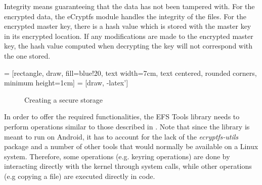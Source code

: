 Integrity means guaranteeing that the data has not been tampered with. For the encrypted data, the eCryptfs module handles the integrity of the files. For the encrypted master key, there is a hash value which is stored with the master key in its encrypted location. If any modifications are made to the encrypted master key, the hash value computed when decrypting the key will not correspond with the one stored.

 = [rectangle, draw, fill=blue!20, 
    text width=7cm, text centered, rounded corners, minimum height=1cm]
 = [draw, -latex']

\begin{figure}[h!]
\centering 
{}
\caption{Creating a secure storage}
\label{fig:create-storage-multi-user}
\end{figure}

In order to offer the required functionalities, the EFS Tools library needs to perform operations similar to those described in . Note that since the library is meant to run on Android, it has to account for the lack of the \textit{ecryptfs-utils} package and a number of other tools that would normally be available on a Linux system. Therefore, some operations (e.g. keyring operations) are done by interacting directly with the kernel through system calls, while other operations (e.g copying a file) are executed directly in code.

